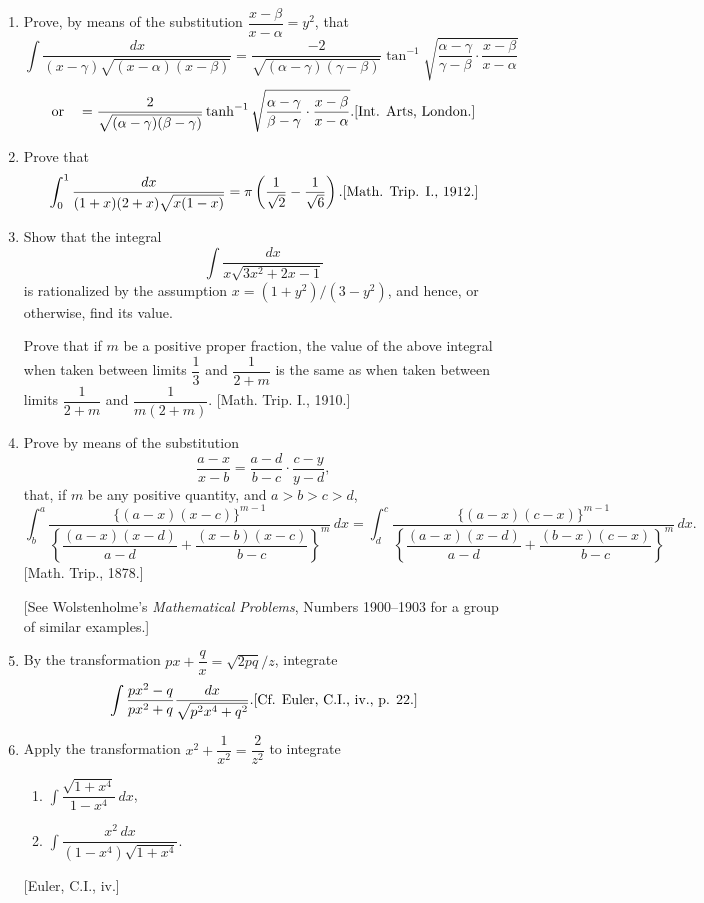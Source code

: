 \documentclass[11pt, a4paper]{article}
\newcommand{\source}[1]{\hfill\textnormal{[#1]}}
\begin{document}
\begin{enumerate}[leftmargin=2em]
\item Prove, by means of the substitution $\dfrac{x-\beta}{x-\alpha}=y^2$, that
\[
\int \dfrac{dx}{(x-\gamma)\sqrt{(x-\alpha)(x-\beta)}}=\dfrac{-2}{\sqrt{(\alpha-\gamma)(\gamma-\beta)}}\tan^{-1}\sqrt{\dfrac{\alpha-\gamma}{\gamma-\beta}\cdot\dfrac{x-\beta}{x-\alpha}}
\]
\[
\text{or} \quad =\dfrac{2}{\sqrt{(\alpha-\gamma)(\beta-\gamma)}}\tanh^{-1}\sqrt{\dfrac{\alpha-\gamma}{\beta-\gamma}\cdot\dfrac{x-\beta}{x-\alpha}}. \source{Int. Arts, London.}
\]

\item Prove that
\[
\int_0^1 \dfrac{dx}{(1+x)(2+x)\sqrt{x(1-x)}}=\pi\left(\dfrac{1}{\sqrt2}-\dfrac{1}{\sqrt6}\right). \source{Math. Trip. I., 1912.}
\]

\item Show that the integral
\[
\int \dfrac{dx}{x\sqrt{3x^2+2x-1}}
\]
is rationalized by the assumption $x=(1+y^2)/(3-y^2)$, and hence, or otherwise, find its value.

Prove that if $m$ be a positive proper fraction, the value of the above integral when taken between limits $\dfrac13$ and $\dfrac{1}{2+m}$ is the same as when taken between limits $\dfrac{1}{2+m}$ and $\dfrac{1}{m(2+m)}$. \source{Math. Trip. I., 1910.}

\item Prove by means of the substitution
\[
\dfrac{a-x}{x-b}=\dfrac{a-d}{b-c}\cdot\dfrac{c-y}{y-d},
\]
that, if $m$ be any positive quantity, and $a>b>c>d$,
\[
\int_b^a \dfrac{\{(a-x)(x-c)\}^{m-1}}{\left\{\dfrac{(a-x)(x-d)}{a-d}+\dfrac{(x-b)(x-c)}{b-c}\right\}^m}\,dx
=\int_d^c \dfrac{\{(a-x)(c-x)\}^{m-1}}{\left\{\dfrac{(a-x)(x-d)}{a-d}+\dfrac{(b-x)(c-x)}{b-c}\right\}^m}\,dx.
\]
\source{Math. Trip., 1878.}

[See Wolstenholme's \textit{Mathematical Problems}, Numbers 1900--1903 for a group of similar examples.]

\item By the transformation $px+\dfrac{q}{x}=\sqrt{2pq}/z$, integrate
\[
\int \dfrac{px^2-q}{px^2+q}\dfrac{dx}{\sqrt{p^2x^4+q^2}}. \source{Cf. Euler, C.I., iv., p. 22.}
\]

\item Apply the transformation $x^2+\dfrac{1}{x^2}=\dfrac{2}{z^2}$ to integrate
\begin{enumerate}[label=(\roman*)]
\item $\displaystyle\int \dfrac{\sqrt{1+x^4}}{1-x^4}\,dx$,
\item $\displaystyle\int \dfrac{x^2\,dx}{(1-x^4)\sqrt{1+x^4}}$.
\end{enumerate}
\source{Euler, C.I., iv.}


\end{enumerate}
\end{document}

